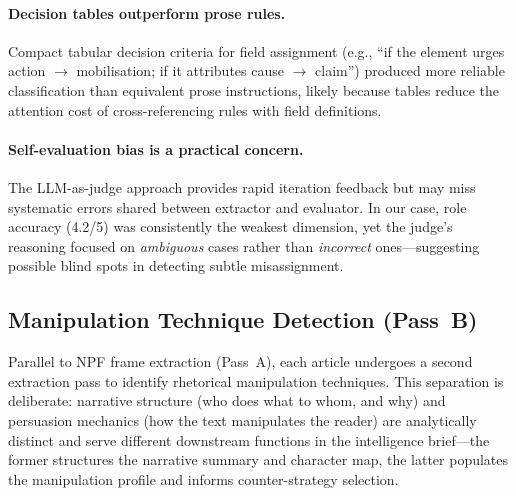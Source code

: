 \documentclass[10pt, a4paper]{article}
\begin{document}
\paragraph{Decision tables outperform prose rules.}
Compact tabular decision criteria for field assignment (e.g., ``if the element urges action $\rightarrow$ mobilisation; if it attributes cause $\rightarrow$ claim'') produced more reliable classification than equivalent prose instructions, likely because tables reduce the attention cost of cross-referencing rules with field definitions.

\paragraph{Self-evaluation bias is a practical concern.}
The LLM-as-judge approach provides rapid iteration feedback but may miss systematic errors shared between extractor and evaluator. In our case, role accuracy (4.2/5) was consistently the weakest dimension, yet the judge's reasoning focused on \emph{ambiguous} cases rather than \emph{incorrect} ones---suggesting possible blind spots in detecting subtle misassignment.





\subsection{Manipulation Technique Detection (Pass~B)}
\label{sec:manipulation_detection}

Parallel to NPF frame extraction (Pass~A), each article undergoes a second extraction pass to identify rhetorical manipulation techniques. This separation is deliberate: narrative structure (who does what to whom, and why) and persuasion mechanics (how the text manipulates the reader) are analytically distinct and serve different downstream functions in the intelligence brief---the former structures the narrative summary and character map, the latter populates the manipulation profile and informs counter-strategy selection.
\end{document}
